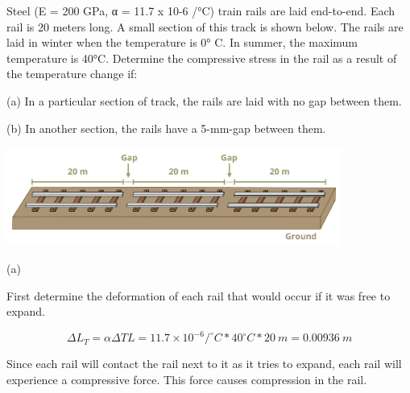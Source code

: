 \documentclass[
  letterpaper,
  DIV=11,
  numbers=noendperiod]{scrreprt}
\begin{document}
\begin{tcolorbox}[enhanced jigsaw, breakable, opacityback=0, toptitle=1mm, left=2mm, colback=white, opacitybacktitle=0.6, colframe=quarto-callout-tip-color-frame, titlerule=0mm, arc=.35mm, leftrule=.75mm, bottomtitle=1mm, colbacktitle=quarto-callout-tip-color!10!white, rightrule=.15mm, title={Example 5.8: Indeterminate thermal expansion without gap. Then add gap
and rework}, bottomrule=.15mm, toprule=.15mm, coltitle=black]

Steel (E = 200 GPa, α = 11.7 x 10-6 /°C) train rails are laid
end-to-end. Each rail is 20 meters long. A small section of this track
is shown below. The rails are laid in winter when the temperature is 0°
C. In summer, the maximum temperature is 40°C. Determine the compressive
stress in the rail as a result of the temperature change if:

(a) In a particular section of track, the rails are laid with no gap
between them.

(b) In another section, the rails have a 5-mm-gap between them.

\begin{center}
\includegraphics[width=4.33333in,height=\textheight]{images/PNGs/Example 5.8.png}
\end{center}

\begin{tcolorbox}[enhanced jigsaw, breakable, opacityback=0, toptitle=1mm, left=2mm, colback=white, opacitybacktitle=0.6, colframe=quarto-callout-tip-color-frame, titlerule=0mm, arc=.35mm, leftrule=.75mm, bottomtitle=1mm, colbacktitle=quarto-callout-tip-color!10!white, rightrule=.15mm, title={Solution}, bottomrule=.15mm, toprule=.15mm, coltitle=black]

(a)

First determine the deformation of each rail that would occur if it was
free to expand.

\[
\Delta L_T=\alpha \Delta T L=11.7 \times 10^{-6}/^\circ{C} * 40^\circ{C} * 20{~m}=0.00936{~m}
\]

Since each rail will contact the rail next to it as it tries to expand,
each rail will experience a compressive force. This force causes
compression in the rail.


\end{tcolorbox}
\end{tcolorbox}
\end{document}
